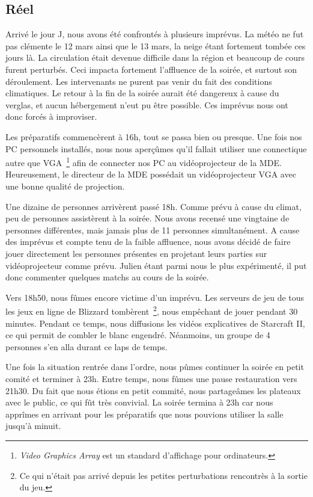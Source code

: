 \subsection{Réel}%
\label{sub:reel}

Arrivé le jour J, nous avons été confrontés à plusieurs imprévus.
La météo ne fut pas clémente le 12 mars ainsi que le 13 mars, la neige étant fortement
tombée ces jours là. La circulation était devenue difficile dans la région et beaucoup de cours
furent perturbés.
Ceci impacta fortement l’affluence de la soirée, et surtout son déroulement. Les intervenants
ne purent pas venir du fait des conditions climatiques. Le retour à la fin de la soirée aurait été
dangereux à cause du verglas, et aucun hébergement n’eut pu être possible.
Ces imprévus nous ont donc forcés à improviser.

Les préparatifs commencèrent à 16h, tout se passa bien ou presque. Une fois nos PC personnels
installés, nous nous aperçûmes qu’il fallait utiliser une connectique autre que VGA\, \footnote{\emph{Video Graphics
Array} est un standard d'affichage pour ordinateurs.} afin de
connecter nos PC au vidéoprojecteur de la MDE. Heureusement, le
directeur de la MDE 
possédait un vidéoprojecteur VGA avec une bonne qualité de projection.

Une dizaine de personnes arrivèrent passé 18h. Comme prévu à cause du climat, peu de
personnes assistèrent à la soirée. Nous avons recensé une vingtaine de personnes
différentes, mais jamais plus de 11 personnes simultanément.
A cause des imprévus et compte tenu de la faible affluence, nous avons décidé de faire jouer
directement les personnes présentes en projetant leurs parties sur vidéoprojecteur comme
prévu. Julien étant parmi nous le plus expérimenté, il put donc commenter quelques matchs
au cours de la soirée.

Vers 18h50, nous fûmes encore victime d’un imprévu. Les serveurs de jeu de tous les jeux en
ligne de Blizzard tombèrent\, \footnote{Ce qui n'était pas arrivé depuis
les petites perturbations rencontrès à la sortie du jeu.}, nous empêchant de jouer pendant 30 minutes. Pendant ce
temps, nous diffusions les vidéos explicatives de Starcraft II, ce qui permit de combler le
blanc engendré. Néanmoins, un groupe de 4 personnes s’en alla durant ce laps de temps.

Une fois la situation rentrée dans l’ordre, nous pûmes continuer la soirée en petit comité et
terminer à 23h. Entre temps, nous fûmes une pause restauration vers
21h30. Du fait que nous étions en petit commité, nous
partageâmes les plateaux avec le public, ce qui fût très
convivial. La soirée termina à 23h car nous apprîmes en arrivant pour les préparatifs
que nous pouvions utiliser la salle jusqu’à minuit.


